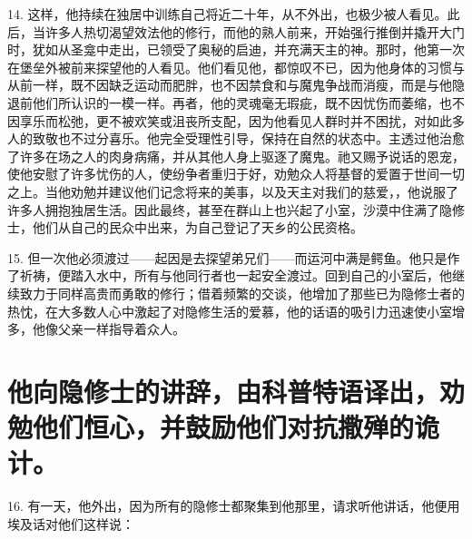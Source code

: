 14. 这样，他持续在独居中训练自己将近二十年，从不外出，也极少被人看见。此后，当许多人热切渴望效法他的修行，而他的熟人前来，开始强行推倒并撬开大门时，犹如从圣龛中走出，已领受了奥秘的启迪，并充满天主的神。那时，他第一次在堡垒外被前来探望他的人看见。他们看见他，都惊叹不已，因为他身体的习惯与从前一样，既不因缺乏运动而肥胖，也不因禁食和与魔鬼争战而消瘦，而是与他隐退前他们所认识的一模一样。再者，他的灵魂毫无瑕疵，既不因忧伤而萎缩，也不因享乐而松弛，更不被欢笑或沮丧所支配，因为他看见人群时并不困扰，对如此多人的致敬也不过分喜乐。他完全受理性引导，保持在自然的状态中。主透过他治愈了许多在场之人的肉身病痛，并从其他人身上驱逐了魔鬼。祂又赐予说话的恩宠，使他安慰了许多忧伤的人，使纷争者重归于好，劝勉众人将基督的爱置于世间一切之上。当他劝勉并建议他们记念将来的美事，以及天主对我们的慈爱，，他说服了许多人拥抱独居生活。因此最终，甚至在群山上也兴起了小室，沙漠中住满了隐修士，他们从自己的民众中出来，为自己登记了天乡的公民资格。\par

15. 但一次他必须渡过——起因是去探望弟兄们——而运河中满是鳄鱼。他只是作了祈祷，便踏入水中，所有与他同行者也一起安全渡过。回到自己的小室后，他继续致力于同样高贵而勇敢的修行；借着频繁的交谈，他增加了那些已为隐修士者的热忱，在大多数人心中激起了对隐修生活的爱慕，他的话语的吸引力迅速使小室增多，他像父亲一样指导着众人。\par


\section{他向隐修士的讲辞，由科普特语译出，劝勉他们恒心，并鼓励他们对抗撒殚的诡计。}

16. 有一天，他外出，因为所有的隐修士都聚集到他那里，请求听他讲话，他便用埃及话对他们这样说：\par


